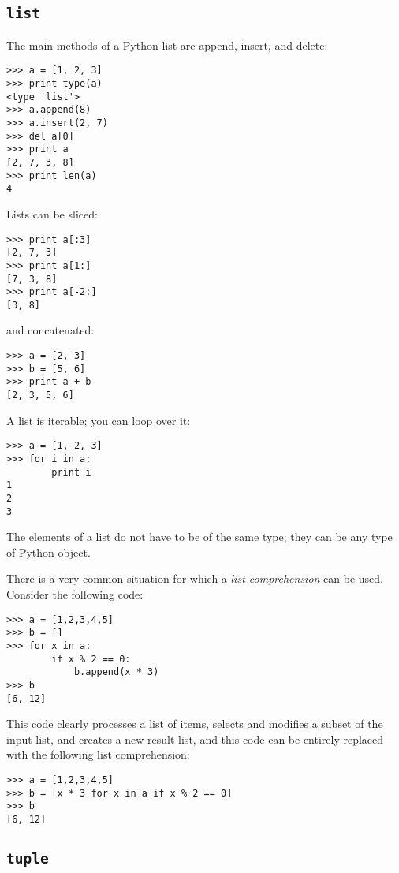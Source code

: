 \documentclass[justified,sixbynine,notoc]{tufte-book}
\def\ft{\small\tt}
\def\inxx#1{\index{#1}}
\begin{document}
\begin{fullwidth}
\goodbreak\subsection{{\ft list}}

\inxx{list}

The main methods of a Python list are append, insert, and delete:
\begin{lstlisting}
>>> a = [1, 2, 3]
>>> print type(a)
<type 'list'>
>>> a.append(8)
>>> a.insert(2, 7)
>>> del a[0]
>>> print a
[2, 7, 3, 8]
>>> print len(a)
4
\end{lstlisting}

Lists can be sliced:
\begin{lstlisting}
>>> print a[:3]
[2, 7, 3]
>>> print a[1:]
[7, 3, 8]
>>> print a[-2:]
[3, 8]
\end{lstlisting}
\noindent and concatenated:
\begin{lstlisting}
>>> a = [2, 3]
>>> b = [5, 6]
>>> print a + b
[2, 3, 5, 6]
\end{lstlisting}

A list is iterable; you can loop over it:
\begin{lstlisting}
>>> a = [1, 2, 3]
>>> for i in a:
        print i
1
2
3
\end{lstlisting}

The elements of a list do not have to be of the same type; they can be any type of Python object.

There is a very common situation for which a {\it list comprehension} can be used.  Consider the following code:
\begin{lstlisting}
>>> a = [1,2,3,4,5]
>>> b = []
>>> for x in a:
        if x % 2 == 0:
            b.append(x * 3)
>>> b
[6, 12]
\end{lstlisting}

This code clearly processes a list of items, selects and modifies a subset of the input list, and creates a new result list, and this code can be entirely replaced with the following list comprehension:
\begin{lstlisting}
>>> a = [1,2,3,4,5]
>>> b = [x * 3 for x in a if x % 2 == 0]
>>> b
[6, 12]
\end{lstlisting}

\goodbreak\subsection{{\ft tuple}}

\inxx{tuple}


\end{fullwidth}
\end{document}
